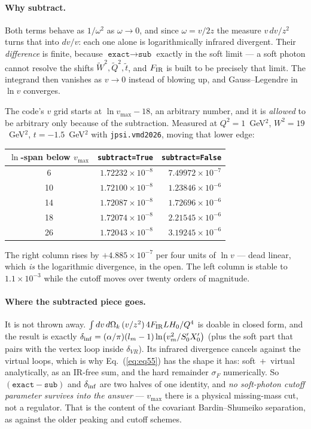 \documentclass[11pt]{article}
\begin{document}
\paragraph{Why subtract.} Both terms behave as $1/\omega^2$ as $\omega\to0$, and since
$\omega=v/2z$ the measure $v\,dv/z^2$ turns that into $dv/v$: each one alone is logarithmically
infrared divergent. Their \emph{difference} is finite, because $\texttt{exact}\to\texttt{sub}$
exactly in the soft limit --- a soft photon cannot resolve the shifts
$\tilde W^2,\tilde Q^2,\tilde t$, and $F_{\rm IR}$ is built to be precisely that limit. The
integrand then vanishes as $v\to0$ instead of blowing up, and Gauss--Legendre in $\ln v$ converges.

The code's $v$ grid starts at $\ln v_{\max}-18$, an arbitrary number, and it is \emph{allowed} to be
arbitrary only because of the subtraction. Measured at $Q^2=1$~GeV$^2$, $W^2=19$~GeV$^2$,
$t=-1.5$~GeV$^2$ with \texttt{jpsi.vmd2026}, moving that lower edge:

\begin{center}
\begin{tabular}{crr}
\toprule
$\ln$-span below $v_{\max}$ & \texttt{subtract=True} & \texttt{subtract=False} \\
\midrule
 6 & $1.72232\times10^{-8}$ & $7.49972\times10^{-7}$ \\
10 & $1.72100\times10^{-8}$ & $1.23846\times10^{-6}$ \\
14 & $1.72087\times10^{-8}$ & $1.72696\times10^{-6}$ \\
18 & $1.72074\times10^{-8}$ & $2.21545\times10^{-6}$ \\
26 & $1.72043\times10^{-8}$ & $3.19245\times10^{-6}$ \\
\bottomrule
\end{tabular}
\end{center}

The right column rises by $+4.885\times10^{-7}$ per four units of $\ln v$ --- dead linear, which
\emph{is} the logarithmic divergence, in the open. The left column is stable to
$1.1\times10^{-3}$ while the cutoff moves over twenty orders of magnitude.

\paragraph{Where the subtracted piece goes.} It is not thrown away.
$\int dv\,d\Omega_k\,(v/z^2)\,4F_{\rm IR}LH_0/Q^4$ is doable in closed form, and the result is
exactly $\delta_{\rm inf}=(\alpha/\pi)(l_m-1)\ln\!\big(v_m^2/S'_0X'_0\big)$ (plus the soft part that
pairs with the vertex loop inside $\delta_{VR}$). Its infrared divergence cancels against the
virtual loops, which is why Eq.~(\ref{eq:eq55}) has the shape it has: soft~$+$~virtual analytically,
as an IR-free sum, and the hard remainder $\sigma_F$ numerically. So $(\texttt{exact}-\texttt{sub})$
and $\delta_{\rm inf}$ are two halves of one identity, and \emph{no soft-photon cutoff parameter
survives into the answer} --- $v_{\max}$ there is a physical missing-mass cut, not a regulator. That
is the content of the covariant Bardin--Shumeiko separation, as against the older peaking and
cutoff schemes.
\end{document}
